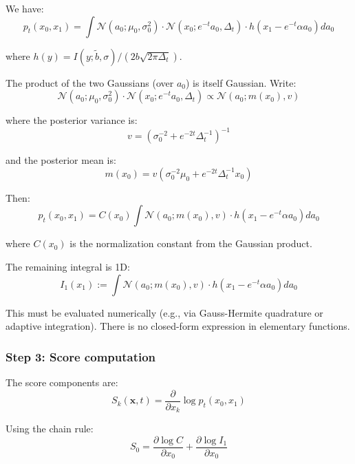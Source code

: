 \documentclass[11pt,a4paper]{article}
\theoremstyle{plain}
\theoremstyle{definition}
\newcommand{\delt}{\Delta_t}
\newcommand{\vct}[1]{\mathbf{#1}}
\begin{document}
We have:
\begin{equation}
p_t(x_0, x_1) = \int \mathcal{N}(a_0; \mu_0, \sigma_0^2) \cdot \mathcal{N}(x_0; e^{-t}a_0, \delt) \cdot h(x_1 - e^{-t}\alpha a_0) da_0
\end{equation}

where $h(y) = I(y; \tilde{b}, \sigma)/(2b\sqrt{2\pi\delt})$.

The product of the two Gaussians (over $a_0$) is itself Gaussian. Write:
\begin{equation}
\mathcal{N}(a_0; \mu_0, \sigma_0^2) \cdot \mathcal{N}(x_0; e^{-t}a_0, \delt) \propto \mathcal{N}(a_0; m(x_0), v)
\end{equation}

where the posterior variance is:
\begin{equation}
v = \left(\sigma_0^{-2} + e^{-2t}\delt^{-1}\right)^{-1}
\end{equation}

and the posterior mean is:
\begin{equation}
m(x_0) = v\left(\sigma_0^{-2}\mu_0 + e^{-2t}\delt^{-1}x_0\right)
\end{equation}

Then:
\begin{equation}
p_t(x_0,x_1) = C(x_0) \int \mathcal{N}(a_0; m(x_0), v) \cdot h(x_1 - e^{-t}\alpha a_0) da_0
\end{equation}

where $C(x_0)$ is the normalization constant from the Gaussian product.

The remaining integral is 1D:
\begin{equation}
I_1(x_1) := \int \mathcal{N}(a_0; m(x_0), v) \cdot h(x_1 - e^{-t}\alpha a_0) da_0
\end{equation}

This must be evaluated numerically (e.g., via Gauss-Hermite quadrature or adaptive integration). There is no closed-form expression in elementary functions.

\subsubsection{Step 3: Score computation}

The score components are:
\begin{equation}
S_k(\vct{x}, t) = \frac{\partial}{\partial x_k}\log p_t(x_0, x_1)
\end{equation}

Using the chain rule:
\begin{equation}
S_0 = \frac{\partial \log C}{\partial x_0} + \frac{\partial \log I_1}{\partial x_0}
\end{equation}
\end{document}
